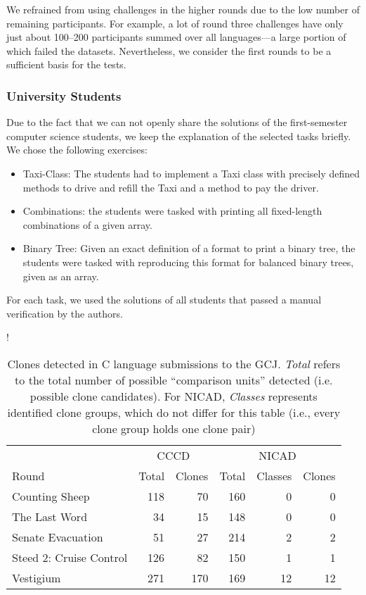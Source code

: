 \documentclass[10pt,journal,compsoc]{IEEEtran}
\def\todo#1{\textcolor{brown!80!yellow!70!black!90!red}{[\textsc{todo}: \textsf{#1}]}}
\begin{document}
We refrained from using challenges in the higher rounds due to the low number of remaining participants. For example, a lot of round three challenges have only just about 100--200 participants summed over all languages---a large portion of which failed the datasets.
Nevertheless, we consider the first rounds to be a sufficient basis for the tests.


\subsubsection{University Students}
Due to the fact that we can not openly share the solutions of the first-semester computer science students, we keep the explanation of the selected tasks briefly.
We chose the following exercises:
\begin{itemize}
  \item Taxi-Class: The students had to implement a Taxi class with precisely defined methods to drive and refill the Taxi and a method to pay the driver.
  \item Combinations: the students were tasked with printing all fixed-length combinations of a given array.
  \item Binary Tree: Given an exact definition of a format to print a binary tree, the students were tasked with reproducing this format for balanced binary trees, given as an array.
\end{itemize}
For each task, we used the solutions of all students that passed a manual verification by the authors.

\begin{table}
  \centering\resizebox\linewidth!{\begin{tabular}{l rr rrr}
    \toprule
    & \multicolumn{2}{c}{CCCD} & \multicolumn{3}{c}{NICAD} \\
    \cmidrule(r){2-3} \cmidrule{4-6}
    Round & Total & Clones & Total & Classes & Clones \\
    \midrule
    Counting Sheep & 118 & 70 & 160 & 0 & 0 \\ %
    The Last Word & 34 & 15 & 148 & 0 & 0 \\
    Senate Evacuation & 51 & 27 & 214 & 2 & 2 \\
    Steed 2: Cruise Control & 126 & 82 &  150 & 1 & 1 \\
    Vestigium & 271 & 170 & 169 & 12 & 12 \\
    \bottomrule
  \end{tabular}}\medskip
  \caption{Clones detected in C language submissions to the GCJ. \textit{Total} refers to the total number of possible \enquote{comparison units} detected (i.e. possible clone candidates). For NICAD, \textit{Classes} represents identified clone groups, which do not differ for this table (i.e., every clone group holds one clone pair)}
  \label{tbl:clones-c}
\end{table}
\end{document}
